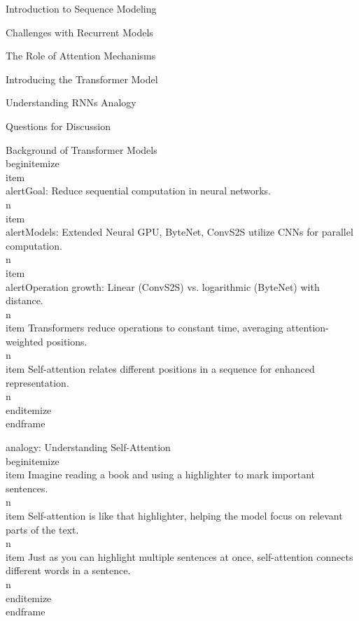 \documentclass{beamer}
\begin{document}
\begin{frame}[]{Introduction to Sequence Modeling}
\begin{frame}[]{Challenges with Recurrent Models}
\begin{frame}[]{The Role of Attention Mechanisms}
\begin{frame}[]{Introducing the Transformer Model}
\begin{frame}[plain]{Understanding RNNs Analogy}
\begin{frame}[]{Questions for Discussion}
\endgroup

\begingroup
{}\n{}\n\begin{frame}[]{Background of Transformer Models}\n\\begin{itemize}
\\item \\alert{Goal: Reduce sequential computation in neural networks.}\\n\\item \\alert{Models: Extended Neural GPU, ByteNet, ConvS2S utilize CNNs for parallel computation.}\\n\\item \\alert{Operation growth: Linear (ConvS2S) vs. logarithmic (ByteNet) with distance.}\\n\\item Transformers reduce operations to constant time, averaging attention-weighted positions.\\n\\item Self-attention relates different positions in a sequence for enhanced representation.\\n\\end{itemize}
\\end{frame}

\endgroup

\begingroup
{}\n{}\n\begin{frame}[plain]{analogy: Understanding Self-Attention}\n\\begin{itemize}
\\item Imagine reading a book and using a highlighter to mark important sentences.\\n\\item Self-attention is like that highlighter, helping the model focus on relevant parts of the text.\\n\\item Just as you can highlight multiple sentences at once, self-attention connects different words in a sentence.\\n\\end{itemize}
\\end{frame}

\endgroup


\end{frame}
\end{frame}
\end{frame}
\end{frame}
\end{frame}
\end{frame}
\end{frame}
\end{frame}
\end{document}
